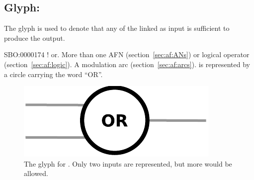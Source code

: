 \subsection{Glyph: }
\label{sec:af:or}

The glyph  is used to denote that any of the  linked as input is sufficient to produce the output.

\begin{glyphDescription}
 \glyphSboTerm SBO:0000174 ! or.
 \glyphOrigin More than one AFN (section~\ref{sec:af:ANs}) or logical operator (section~\ref{sec:af:logic}).
 \glyphTarget  A modulation arc (section~\ref{sec:af:arcs}). 
 \glyphNode {} is represented by a circle carrying the word ``OR''.
 \end{glyphDescription}

\begin{figure}[H]
  \centering
  \includegraphics[scale = 0.5]{images/or}
  \caption{The \AF glyph for . Only two inputs are represented, but more would be allowed.}
  \label{fig:af:or}
\end{figure}
